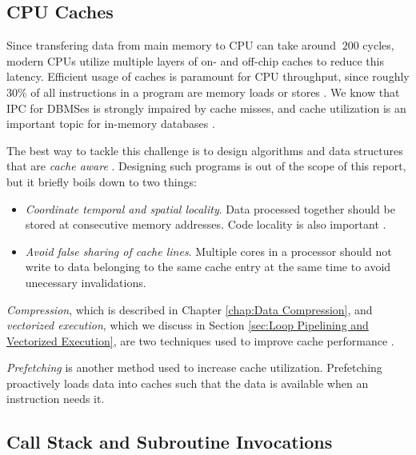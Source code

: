 \subsection{CPU Caches}
\label{sub:CPU Caches}
Since transfering data from main memory to CPU can take around $~200$ cycles, modern CPUs utilize multiple layers of on- and off-chip caches to reduce this latency. Efficient usage of caches is paramount for CPU throughput, since roughly 30\% of all instructions in a program are memory loads or stores \cite{Boncz2005-wj}. We know that IPC for DBMSes is strongly impaired by cache misses, and cache utilization is an important topic for in-memory databases \cite{Exasol2014-xh}.

The best way to tackle this challenge is to design algorithms and data structures that are \textit{cache aware} \cite{Farber2012-vh}. Designing such programs is out of the scope of this report, but it briefly boils down to two things:
\begin{itemize}
  \item \textit{Coordinate temporal and spatial locality}. Data processed together should be stored at consecutive memory addresses. Code locality is also important \cite{Neumann2011-uq}.
  \item \textit{Avoid false sharing of cache lines}. Multiple cores in a processor should not write to data belonging to the same cache entry at the same time to avoid unecessary invalidations.
\end{itemize}
\textit{Compression}, which is described in Chapter \ref{chap:Data Compression}, and \textit{vectorized execution}, which we discuss in Section \ref{sec:Loop Pipelining and Vectorized Execution}, are two techniques used to improve cache performance \cite{Larson2013-mc, Lemke2010-is}.

\textit{Prefetching} is another method used to increase cache utilization. Prefetching proactively loads data into caches such that the data is available when an instruction needs it.

\subsection{Call Stack and Subroutine Invocations}
\label{sub:Call Stack and Subroutine Invocations}

